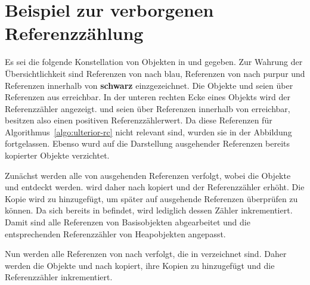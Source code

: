 \chapter{Beispiel zur verborgenen Referenzzählung}
\label{cha:ulterior-example}

Es sei die folgende Konstellation von Objekten in \Nursery und \Mature gegeben.
Zur Wahrung der Übersichtlichkeit sind Referenzen von \Nursery nach \Mature \textcolor{ctcolormain}{blau}, Referenzen von \Mature nach \Nursery \textcolor{ctcoloraccessory}{purpur} und Referenzen innerhalb von \Nursery \textbf{schwarz} einzgezeichnet.
Die Objekte  und  seien über Referenzen aus \Roots erreichbar.
In der unteren rechten Ecke eines Objekts wird der Referenzzähler angezeigt.
 und  seien über Referenzen innerhalb von \Mature erreichbar, besitzen also einen positiven Referenzzählerwert.
Da diese Referenzen für Algorithmus~\ref{algo:ulterior-rc} nicht relevant sind, wurden sie in der Abbildung fortgelassen.
Ebenso wurd auf die Darstellung ausgehender Referenzen bereits kopierter Objekte verzichtet.

\begin{center}
	
\end{center}

Zunächst werden alle von \Roots ausgehenden Referenzen verfolgt, wobei die Objekte  und  entdeckt werden.
 wird daher nach \Mature kopiert und der Referenzzähler erhöht.
Die Kopie  wird zu  hinzugefügt, um später  auf ausgehende Referenzen überprüfen zu können.
Da sich  bereits in \Mature befindet, wird lediglich dessen Zähler inkrementiert.
Damit sind alle Referenzen von Basisobjekten abgearbeitet und die entsprechenden Referenzzähler von Heapobjekten angepasst.

\begin{center}
	
\end{center}

Nun werden alle Referenzen von \Mature nach \Nursery verfolgt, die in  verzeichnet sind.
Daher werden die Objekte  und  nach \Mature kopiert, ihre Kopien zu  hinzugefügt und die Referenzzähler inkrementiert.

\begin{center}
	
	
	
\end{center}

